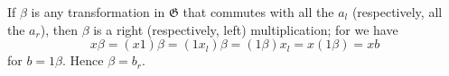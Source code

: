 If $\beta$ is any transformation in $\mathfrak{G}$ that commutes with all the $a_l$ (respectively, all the $a_r$), then $\beta$ is a right (respectively, left) multiplication; for we have
$$x\beta = (x1)\beta = (1x_l)\beta = (1\beta)x_l = x(1\beta) = xb$$
for $b = 1\beta$. Hence $\beta = b_r$.
